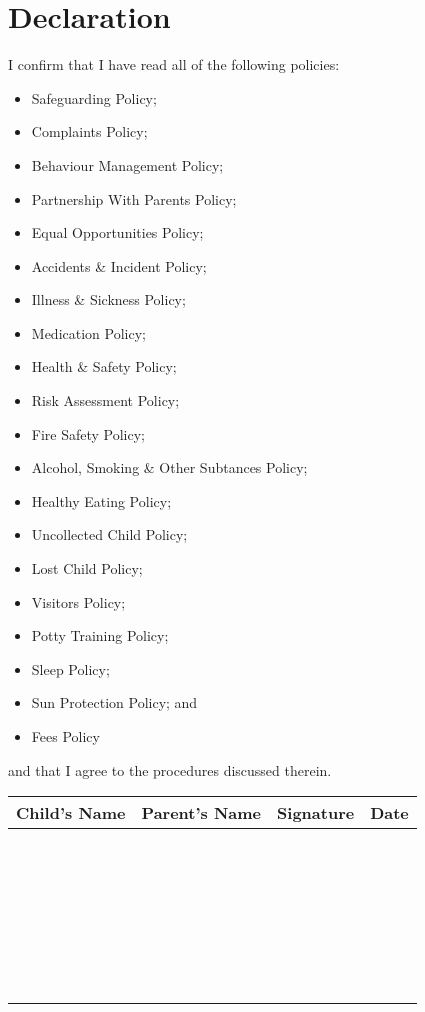 \documentclass[10pt,a4paper]{article}
\begin{document}
\section{Declaration}

I confirm that I have read all of the following policies:

\begin{itemize}
  \item Safeguarding Policy;
  \item Complaints Policy;
  \item Behaviour Management Policy;
  \item Partnership With Parents Policy;
  \item Equal Opportunities Policy;
  \item Accidents \& Incident Policy;
  \item Illness \& Sickness Policy;
  \item Medication Policy;
  \item Health \& Safety Policy;
  \item Risk Assessment Policy;
  \item Fire Safety Policy;
  \item Alcohol, Smoking \& Other Subtances Policy;
  \item Healthy Eating Policy;
  \item Uncollected Child Policy;
  \item Lost Child Policy;
  \item Visitors Policy;
  \item Potty Training Policy;
  \item Sleep Policy;
  \item Sun Protection Policy; and
  \item Fees Policy
  \end{itemize}

and that I agree to the procedures discussed therein.

\begin{table}[h]
  \def\arraystretch{2.0}
  \begin{tabularx}{\textwidth}{!{\color{gray}\vrule}X!{\color{gray}\vrule}X!{\color{gray}\vrule}X!{\color{gray}\vrule}X!{\color{gray}\vrule}}
    \hline
    Child's Name & Parent's Name & Signature & Date \\
    \hline
    ~ & ~ & ~ & \\
    \hline
    ~ & ~ & ~ & \\
    \hline
    ~ & ~ & ~ & \\
    \hline
    ~ & ~ & ~ & \\
    \hline
    ~ & ~ & ~ & \\
    \hline
    ~ & ~ & ~ & \\
    \hline
  \end{tabularx}
\end{table}
\end{document}

